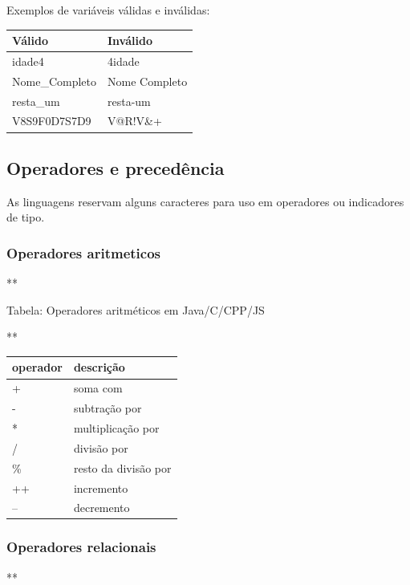 \documentclass[12pt,a4paper]{article}
\begin{document}
    Exemplos de variáveis válidas e inválidas:

\begin{longtable}[]{@{}ll@{}}
\toprule()
Válido & Inválido \\
\midrule()
\endhead
idade4 & 4idade \\
Nome\_Completo & Nome Completo \\
resta\_um & resta-um \\
V8S9F0D7S7D9 & V@R!V\&+ \\
\bottomrule()
\end{longtable}

    \hypertarget{operadores-e-preceduxeancia}{%
\subsection{Operadores e
precedência}\label{operadores-e-preceduxeancia}}

    As linguagens reservam alguns caracteres para uso em operadores ou
indicadores de tipo.

    \hypertarget{operadores-aritmeticos}{%
\subsubsection{Operadores aritmeticos}\label{operadores-aritmeticos}}

    **

Tabela: Operadores aritméticos em Java/C/CPP/JS

**

\begin{longtable}[]{@{}ll@{}}
\toprule()
operador & descrição \\
\midrule()
\endhead
+ & soma com \\
- & subtração por \\
* & multiplicação por \\
/ & divisão por \\
\% & resto da divisão por \\
++ & incremento \\
-- & decremento \\
\bottomrule()
\end{longtable}

    \hypertarget{operadores-relacionais}{%
\subsubsection{Operadores relacionais}\label{operadores-relacionais}}

    **
\end{document}
